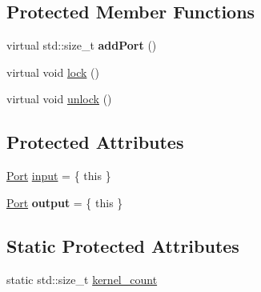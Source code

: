 \subsection*{Protected Member Functions}
\begin{DoxyCompactItemize}
\item 
\hypertarget{classraft_1_1kernel_ab206ff6ee1b729ab8875e181cbef227f}{}virtual std\+::size\+\_\+t {\bfseries add\+Port} ()\label{classraft_1_1kernel_ab206ff6ee1b729ab8875e181cbef227f}

\item 
virtual void \hyperlink{classraft_1_1kernel_abd7f3bf1f689840f7d61f472f520c258}{lock} ()
\item 
virtual void \hyperlink{classraft_1_1kernel_a7966dcabb0ed65ac52f6f78918256861}{unlock} ()
\end{DoxyCompactItemize}
\subsection*{Protected Attributes}
\begin{DoxyCompactItemize}
\item 
\hyperlink{class_port}{Port} \hyperlink{classraft_1_1kernel_a6edbe35a56409d402e719b3ac36d6554}{input} = \{ this \}
\item 
\hypertarget{classraft_1_1kernel_a1c65cc76ecaa8880ba527e5a146ca4ba}{}\hyperlink{class_port}{Port} {\bfseries output} = \{ this \}\label{classraft_1_1kernel_a1c65cc76ecaa8880ba527e5a146ca4ba}

\end{DoxyCompactItemize}
\subsection*{Static Protected Attributes}
\begin{DoxyCompactItemize}
\item 
static std\+::size\+\_\+t \hyperlink{classraft_1_1kernel_a98e05f7418c208e28b9112e92df7eccf}{kernel\+\_\+count}
\end{DoxyCompactItemize}

